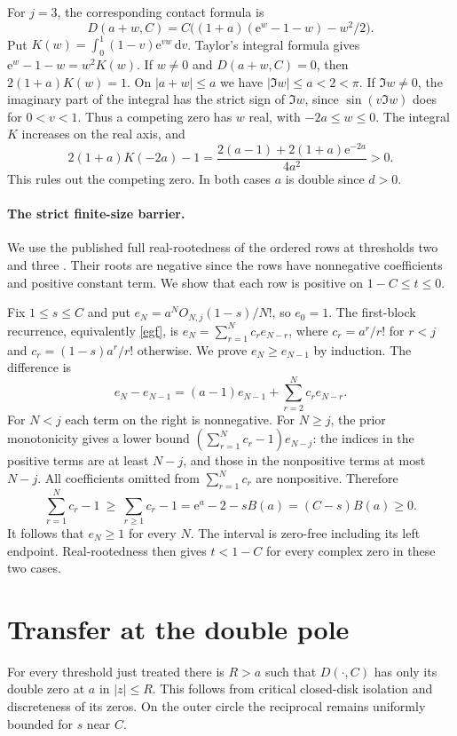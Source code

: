 \documentclass[11pt]{article}
\newcommand{\ee}{\mathrm e}
\newcommand{\dd}{\,\mathrm d}
\begin{document}
For $j=3$, the corresponding contact formula is
\[
 D(a+w,C)=C\bigl((1+a)(\ee^w-1-w)-w^2/2\bigr).
\]
Put $K(w)=\int_0^1(1-v)\ee^{vw}\dd v$. Taylor's integral formula gives $\ee^w-1-w=w^2K(w)$. If $w\ne0$ and $D(a+w,C)=0$, then $2(1+a)K(w)=1$. On $|a+w|\le a$ we have $|\Im w|\le a<2<\pi$. If $\Im w\ne0$, the imaginary part of the integral has the strict sign of $\Im w$, since $\sin(v\Im w)$ does for $0<v<1$. Thus a competing zero has $w$ real, with $-2a\le w\le0$. The integral $K$ increases on the real axis, and
\[
 2(1+a)K(-2a)-1
 =\frac{2(a-1)+2(1+a)\ee^{-2a}}{4a^2}>0.
\]
This rules out the competing zero. In both cases $a$ is double since $d>0$.

\paragraph{The strict finite-size barrier.}
We use the published full real-rootedness of the ordered rows at thresholds two and three \cite{two,three}. Their roots are negative since the rows have nonnegative coefficients and positive constant term. We show that each row is positive on $1-C\le t\le0$.

Fix $1\le s\le C$ and put $e_N=a^NO_{N,j}(1-s)/N!$, so $e_0=1$.
The first-block recurrence, equivalently \eqref{egf}, is $e_N=\sum_{r=1}^N c_r e_{N-r}$, where $c_r=a^r/r!$ for $r<j$ and $c_r=(1-s)a^r/r!$ otherwise. We prove $e_N\ge e_{N-1}$ by induction. The difference is
\[
 e_N-e_{N-1}=(a-1)e_{N-1}+\sum_{r=2}^N c_r e_{N-r}.
\]
For $N<j$ each term on the right is nonnegative. For $N\ge j$, the prior monotonicity gives a lower bound $(\sum_{r=1}^N c_r-1)e_{N-j}$: the indices in the positive terms are at least $N-j$, and those in the nonpositive terms at most $N-j$. All coefficients omitted from $\sum_{r=1}^N c_r$ are nonpositive. Therefore
\[
 \sum_{r=1}^N c_r-1\ \ge\ \sum_{r\ge1}c_r-1
  =\ee^a-2-sB(a)=(C-s)B(a)\ge0 .
\]
It follows that $e_N\ge1$ for every $N$. The interval is zero-free including its left endpoint. Real-rootedness then gives $t<1-C$ for every complex zero in these two cases.

\section{Transfer at the double pole}
For every threshold just treated there is $R>a$ such that $D(\cdot,C)$ has only its double zero at $a$ in $|z|\le R$. This follows from critical closed-disk isolation and discreteness of its zeros. On the outer circle the reciprocal remains uniformly bounded for $s$ near $C$.
\end{document}
